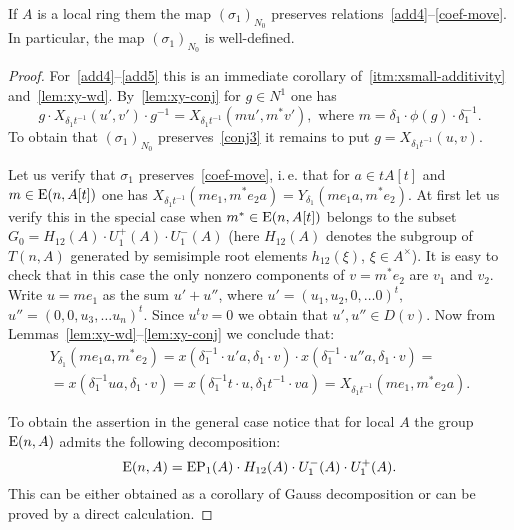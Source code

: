 \begin{prop}
    If $A$ is a local ring them the map $(\sigma_1)_{N_0}$ preserves relations~\eqref{add4}--\eqref{coef-move}.
    In particular, the map $(\sigma_1)_{N_0}$ is well-defined.
\end{prop}
\begin{proof}
    For~\eqref{add4}--\eqref{add5} this is an immediate corollary of~\cref{itm:xsmall-additivity} and~\cref{lem:xy-wd}.
    By~\cref{lem:xy-conj} for $g \in N^1$ one has
    \begin{equation}
        \label{eq:xy-conj-n1}
        g \cdot X_{\delta_1 t^{-1}}(u', v') \cdot g^{-1} = X_{\delta_1 t^{-1}}(mu', m^*v'), \text{ where } m = \delta_1 \cdot \phi(g) \cdot \delta_1^{-1}.
    \end{equation}
    To obtain that $(\sigma_1)_{N_0}$ preserves~\eqref{conj3} it remains to put $g = X_{\delta_1 t^{-1}}(u, v)$.

    Let us verify that $\sigma_1$ preserves~\eqref{coef-move}, i.\,e. that for $a\in tA[t]$ and $m \in \operatorname{E}(n, A[t])$ one has
    $X_{\delta_1 t^{-1}}(me_1, m^*e_2 a) = Y_{\delta_1}(me_1 a, m^* e_2)$.
    At first let us verify this in the special case when $m^* \in \operatorname{E}(n, A[t])$ belongs to the subset $G_0 = H_{12}(A) \cdot U^+_1(A) \cdot U^-_1(A)$
    (here $H_{12}(A)$ denotes the subgroup of $T(n, A)$ generated by semisimple root elements $h_{12}(\xi)$, $\xi \in A^\times$).
    It is easy to check that in this case the only nonzero components of $v = m^* e_2$ are $v_1$ and $v_2$.
    Write $u = m e_1$ as the sum $u' + u''$, where $u' = (u_1, u_2, 0, \ldots 0)^t,$ $u'' = (0, 0, u_3, \ldots u_n)^t$.
    Since $u^t v = 0$ we obtain that $u', u'' \in D(v)$.
    Now from Lemmas~\ref{lem:xy-wd}--\ref{lem:xy-conj} we conclude that:
    \begin{multline}
        \label{eq:special-case}
        Y_{\delta_1}(me_{1}a, m^* e_2) = x(\delta_1^{-1} \cdot u'a, \delta_1\cdot  v) \cdot x(\delta_1^{-1}\cdot u''a, \delta_1 \cdot v) = \\
        = x(\delta_1^{-1} ua, \delta_1 \cdot v) = x(\delta_1^{-1}t \cdot u, \delta_{1}t^{-1} \cdot v a) = X_{\delta_1 t^{-1}}(me_1, m^*e_2 a).
    \end{multline}

    To obtain the assertion in the general case notice that for local $A$ the group $\operatorname{E}(n, A)$ admits the following decomposition:
    \[\operatorname{E}(n, A) = \mathrm{EP}_1(A) \cdot H_{12}(A) \cdot U^-_1(A) \cdot U^+_1(A).\]
    This can be either obtained as a corollary of Gauss decomposition or can be proved by a direct calculation. %


\end{proof}
